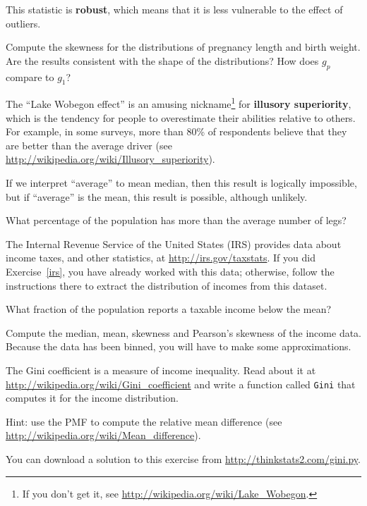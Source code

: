 \documentclass[12pt]{book}
\begin{document}
This statistic is {\bf robust}, which means that it is less vulnerable
to the effect of outliers.

\begin{exercise}
Compute the skewness for the distributions of pregnancy length and
birth weight.  Are the results consistent with the shape of the
distributions?  How does $g_p$ compare to $g_1$?

\end{exercise}


\begin{exercise}
The ``Lake Wobegon effect'' is an amusing nickname\footnote{If you
  don't get it, see \url{http://wikipedia.org/wiki/Lake_Wobegon}.} for {\bf
  illusory superiority}, which is the tendency for people to
overestimate their abilities relative to others.  For example, in some
surveys, more than 80\% of respondents believe that they are better
than the average driver (see
  \url{http://wikipedia.org/wiki/Illusory_superiority}).

If we interpret ``average'' to mean median, then this result is
logically impossible, but if ``average'' is the mean, this result is
possible, although unlikely.

What percentage of the population has more than the average number
of legs?

\end{exercise}


\begin{exercise}
The Internal Revenue Service of the United States (IRS) provides data
about income taxes, and other statistics, at \url{http://irs.gov/taxstats}.
If you did Exercise~\ref{irs}, you have already worked with this data;
otherwise, follow the instructions there to extract the distribution
of incomes from this dataset.

What fraction of the population reports a taxable income below the
mean?

Compute the median, mean, skewness and Pearson's skewness of the income
data.  Because the data has been binned, you will have to make
some approximations.

The Gini coefficient is a measure of income inequality.
Read about it at \url{http://wikipedia.org/wiki/Gini_coefficient} and write a
function called {\tt Gini} that computes it for the income
distribution.

Hint: use the PMF to compute the relative mean difference
(see \url{http://wikipedia.org/wiki/Mean_difference}).

You can download a solution to this exercise from \url{http://thinkstats2.com/gini.py}.

\end{exercise}
\end{document}
